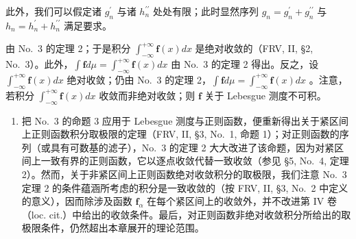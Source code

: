 此外，我们可以假定诸 \(g_{n}^{\prime}\) 与诸 \(h_{n}^{\prime\prime}\) 处处有限；此时显然序列 \(g_{n}=g_{n}^{\prime}+g_{n}^{\prime\prime}\) 与 \(h_{n}=h_{n}^{\prime}+h_{n}^{\prime\prime}\) 满足要求。

由 No.~3 的定理 2；于是积分 \(\int_{-\infty}^{+\infty} \mathbf{f}(x) dx\) 是绝对收敛的（FRV, II, §2, No.~3）。此外，\(\int \mathbf{f} d\mu = \int_{-\infty}^{+\infty} \mathbf{f}(x) dx\) 由 No.~3 的定理 2 得出。反之，设 \(\int_{-\infty}^{+\infty} \mathbf{f}(x) dx\) 绝对收敛；仍由 No.~3 的定理 2，\(\int \mathbf{f} d\mu = \int_{-\infty}^{+\infty} \mathbf{f}(x) dx\) 。注意，若积分 \(\int_{-\infty}^{+\infty} \mathbf{f}(x) dx\) 收敛而非绝对收敛；则 \(\mathbf{f}\) 关于 Lebesgue 测度不可积。

\begin{enumerate}
\def\labelenumi{\arabic{enumi})}
\setcounter{enumi}{1}
\tightlist
\item
  把 No.~3 的命题 3 应用于 Lebesgue 测度与正则函数，便重新得出关于紧区间上正则函数积分取极限的定理（FRV, II, §3, No.~1, 命题 1）；对正则函数的序列（或具有可数基的滤子），No.~3 的定理 2 大大改进了该命题，因为对紧区间上一致有界的正则函数，它以逐点收敛代替一致收敛（参见 §5, No.~4, 定理 2）。然而，关于非紧区间上正则函数绝对收敛积分的取极限，我们注意 No.~3 定理 2 的条件蕴涵所考虑的积分是一致收敛的（按 FRV, II, §3, No.~2 中定义的意义），因而除涉及函数 \(\mathbf{f}_{\alpha}\) 在每个紧区间上的收敛外，并不改进第 IV 卷（loc. cit.）中给出的收敛条件。最后，对正则函数非绝对收敛积分所给出的取极限条件，仍然超出本章展开的理论范围。
\end{enumerate}


